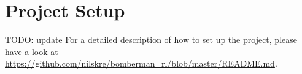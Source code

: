 \setcounter{section}{-1}
\section{Project Setup}

TODO: update
For a detailed description of how to set up the project, please have a look at \url{https://github.com/nilskre/bomberman_rl/blob/master/README.md}.